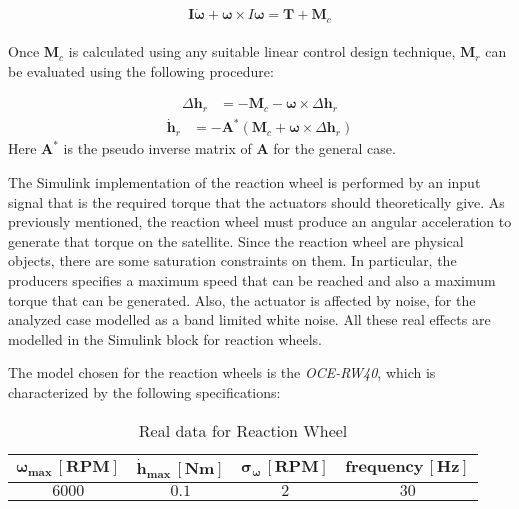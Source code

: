 	\begin{equation*}
		\boldsymbol{I} \dot{\boldsymbol{\omega}} + \boldsymbol{\omega} \times I \boldsymbol{\omega} = \mathbf{T} + \mathbf{M}_c
	\end{equation*}\\
Once \( \mathbf{M}_c \) is calculated using any suitable linear control design technique,  \( \mathbf{M}_r \) can be evaluated using the following procedure:
	
	\begin{align*}
		\Delta \mathbf{h}_r &= -\mathbf{M}_c - \boldsymbol{\omega} \times \Delta \mathbf{h}_r 
	\end{align*}
	\begin{align*}
	\dot{\mathbf{h}}_r &= -\mathbf{A}^* ( \mathbf{M}_c + \boldsymbol{\omega} \times \Delta \mathbf{h}_r )
    \end{align*}
Here \( \mathbf{A}^* \) is the pseudo inverse matrix of \( \mathbf{A} \) for the general case.

The Simulink implementation of the reaction wheel is performed by an input signal that is the required torque that the actuators should theoretically give. As previously mentioned, the reaction wheel must produce an angular acceleration to generate that torque on the satellite. Since the reaction wheel are physical objects, there are some saturation constraints on them. In particular, the producers specifies a maximum speed that can be reached and also a maximum torque that can be generated. Also, the actuator is affected by noise, for the analyzed case modelled as a band limited white noise. All these real effects are modelled in the Simulink block for reaction wheels.

The model chosen for the reaction wheels is the \textit{OCE-RW40}, which is characterized by the following specifications:

\begin{table}[H]

    \centering
    \begin{tabular}{|c|c|c|c|}
    \hline
    $\bm{\omega_{max} \, [RPM]}$ & $\bm{\dot{h}_{max} \, [Nm]}$ & $\bm{\sigma_{\omega} \, [RPM]}$ & $\bm{frequency \, [Hz]}$\\
    \hline
    $6000$ & $0.1$ & $2$ & $30$ \\
    \hline
    \end{tabular}
    
    \caption{Real data for Reaction Wheel}
    \label{table:RW}
    
\end{table}
